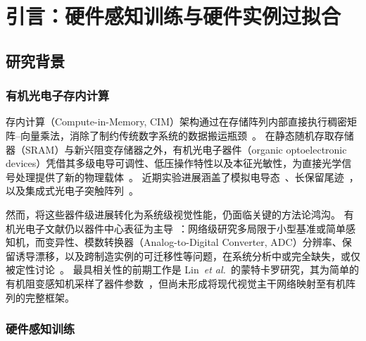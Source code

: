 
\chapter{引言：硬件感知训练与硬件实例过拟合}
\label{chap:hat-instance-overfitting}

\section{研究背景}

\subsection{有机光电子存内计算}

存内计算（Compute-in-Memory, CIM）架构通过在存储阵列内部直接执行稠密矩阵--向量乘法，消除了制约传统数字系统的数据搬运瓶颈~\parencite{horowitz2014computing,peng2020dnnneurosim,lanza2025memristor}。
在静态随机存取存储器（SRAM）与新兴阻变存储器之外，有机光电子器件（organic optoelectronic devices）凭借其多级电导可调性、低压操作特性以及本征光敏性，为直接光学信号处理提供了新的物理载体~\parencite{xu2025emerging,guo2024organic,photonics2025organicreview}。
近期实验进展涵盖了模拟电导态~\parencite{guo2024organic,jung2024organicfilaments}、长保留尾迹~\parencite{zeng2023organicmemristor}，以及集成式光电子突触阵列~\parencite{gebregiorgis2023organiccim,zhang2025opect,liu2024wearable}。

然而，将这些器件级进展转化为系统级视觉性能，仍面临关键的方法论鸿沟。
有机光电子文献仍以器件中心表征为主导~\parencite{harikesh2024oeneurons}：网络级研究多局限于小型基准或简单感知机，而变异性、模数转换器（Analog-to-Digital Converter, ADC）分辨率、保留诱导漂移，以及跨制造实例的可迁移性等问题，在系统分析中或完全缺失，或仅被定性讨论~\parencite{zeng2023organicmemristor,jung2024organicfilaments}。
最具相关性的前期工作是 Lin~\emph{et al.}~的蒙特卡罗研究，其为简单的有机阻变感知机采样了器件参数~\parencite{lin2016physical}，但尚未形成将现代视觉主干网络映射至有机阵列的完整框架。

\subsection{硬件感知训练}

